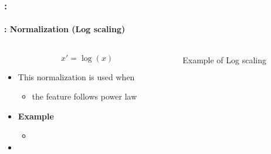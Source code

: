 \documentclass[xcolor=table]{beamer}
\begin{document}
\begin{frame}
	\frametitle{\insertshortsubtitle: \insertsection}
	\framesubtitle{\insertsubsection: Normalization (Log scaling)}
	
	\begin{columns}
		\begin{column}{.5\textwidth}
			
	\[x' = \log(x)	\]
	
	\begin{itemize}
		\item This normalization is used when
		\begin{itemize}
			\item the feature follows power law
		\end{itemize}
		\item \textbf{Example}
		\begin{itemize}
			\item {}
		\end{itemize}
		\item {}
	\end{itemize}
	\end{column}
	\begin{column}{.5\textwidth}
		
		\begin{center}
			Example of Log scaling \cite{2021-google-prep}
		\end{center}
	\end{column}
\end{columns}

\end{frame}
\end{document}
